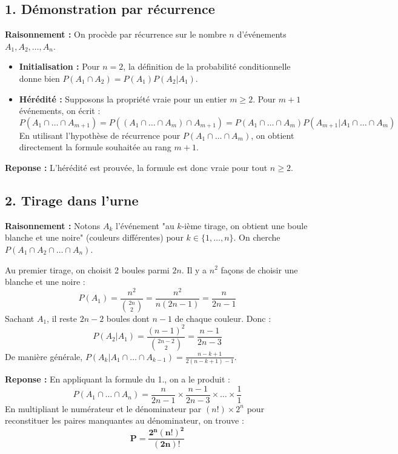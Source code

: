 \documentclass[11pt,a4paper]{article}
\begin{document}
\subsection*{1. Démonstration par récurrence}

\textbf{Raisonnement :} On procède par récurrence sur le nombre $n$ d'événements $A_1, A_2, \dots, A_n$.
\begin{itemize}
    \item \textbf{Initialisation :} Pour $n=2$, la définition de la probabilité conditionnelle donne bien $P(A_1 \cap A_2) = P(A_1)P(A_2|A_1)$.
    \item \textbf{Hérédité :} Supposons la propriété vraie pour un entier $m \ge 2$.
    Pour $m+1$ événements, on écrit :
    $$P(A_1 \cap \dots \cap A_{m+1}) = P((A_1 \cap \dots \cap A_m) \cap A_{m+1}) = P(A_1 \cap \dots \cap A_m)P(A_{m+1} | A_1 \cap \dots \cap A_m)$$
    En utilisant l'hypothèse de récurrence pour $P(A_1 \cap \dots \cap A_m)$, on obtient directement la formule souhaitée au rang $m+1$.
\end{itemize}

\textbf{Reponse :} L'hérédité est prouvée, la formule est donc vraie pour tout $n \ge 2$.

\subsection*{2. Tirage dans l'urne}

\textbf{Raisonnement :} Notons $A_k$ l'événement "au $k$-ième tirage, on obtient une boule blanche et une noire" (couleurs différentes) pour $k \in \{1, \dots, n\}$. On cherche $P(A_1 \cap A_2 \cap \dots \cap A_n)$.

Au premier tirage, on choisit 2 boules parmi $2n$. Il y a $n^2$ façons de choisir une blanche et une noire :
$$P(A_1) = \frac{n^2}{\binom{2n}{2}} = \frac{n^2}{n(2n-1)} = \frac{n}{2n-1}$$
Sachant $A_1$, il reste $2n-2$ boules dont $n-1$ de chaque couleur. Donc :
$$P(A_2|A_1) = \frac{(n-1)^2}{\binom{2n-2}{2}} = \frac{n-1}{2n-3}$$
De manière générale, $P(A_k | A_1 \cap \dots \cap A_{k-1}) = \frac{n-k+1}{2(n-k+1)-1}$.

\textbf{Reponse :} En appliquant la formule du 1., on a le produit :
$$P(A_1 \cap \dots \cap A_n) = \frac{n}{2n-1} \times \frac{n-1}{2n-3} \times \dots \times \frac{1}{1}$$
En multipliant le numérateur et le dénominateur par $(n!) \times 2^n$ pour reconstituer les paires manquantes au dénominateur, on trouve :
$$ \mathbf{P = \frac{2^n(n!)^2}{(2n)!}} $$
\end{document}
